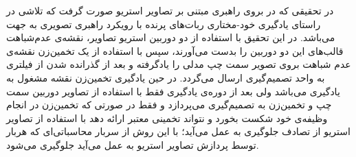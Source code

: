در تحقیقی که در  بروی راهبری مبتنی بر تصاویر استریو صورت گرفت که تلاشی در راستای یادگیری خود-مختاری ربات‌های پرنده با رویکرد راهبری تصویری به جهت  می‌باشد. در این تحقیق با استفاده از دو دوربین استریو تصاویر، نقشه‌ی عدم‌شباهت قالب‌های این دو دوربین را بدست می‌آورند، سپس با استفاده از یک تخمین‌زن نقشه‌ی عدم شباهت بروی تصویر سمت چپ مدلی را یادگرفته و بعد از گذرانده شدن از فیلتری به واحد تصمیم‌گیری ارسال می‌گردد. در حین یادگیری تخمین‌‌زن نقشه مشغول به یادگیری می‌باشد ولی بعد از دوره‌ی یادگیری فقط با استفاده از تصاویر دوربین سمت چپ و تخمین‌زن به تصمیم‌گیری می‌پردازد و فقط در صورتی که تخمین‌زن در انجام وظیفه‌ی خود شکست بخورد و نتواند تخمینی معتبر ارائه دهد با استفاده از تصاویر استریو از تصادف جلوگیری به عمل می‌آید؛ با این روش از سربار محاسباتی‌ای که هربار توسط پردازش تصاویر استریو به عمل می‌آید جلوگیری می‌شود.
